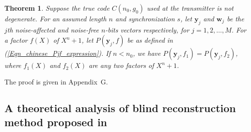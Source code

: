\documentclass[10pt,journal]{IEEEtran}
\newtheorem{theorem}{Theorem}
\begin{document}
% 
\begin{theorem}
\label{Theorem_chinese}
%  
Suppose the true code $C(n_0,g_0)$ used at the transmitter is not degenerate.
For an assumed length $n$ and synchronization $s$, let $\mathbf{y}_j$ and $\mathbf{w}_j$ be the $j$th noise-affected and 
noise-free $n$-bits vectors respectively, for $j =1,2,\ldots,M$.
For a factor $f(X)$ of $X^n+1$, let $P(\mathbf{y}_j,f)$ be as defined in (\ref{Eqn_chinese_Pjf_expression}).
If $n < n_0$, we have $P(\mathbf{y}_j,f_1) = P(\mathbf{y}_j,f_2)$, where $f_1(X)$ and $f_2(X)$ are
any two factors of $X^n+1$.
% 
\end{theorem}
%  
\begin{IEEEproof}
%  
The proof is given in Appendix~G. 
% 
\end{IEEEproof}
% 


\subsection{A theoretical analysis of blind reconstruction method proposed in \cite{Zhou2013_Entropy}}
\end{document}

